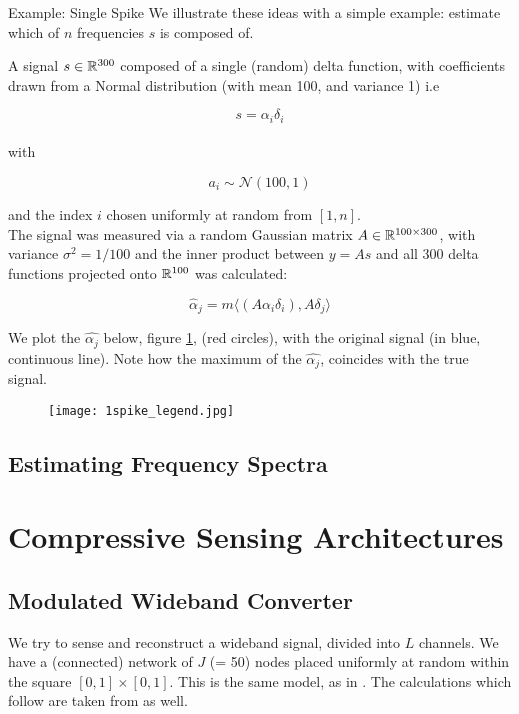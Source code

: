 \begin{example}{Example: Single Spike}
We illustrate these ideas with a simple example: estimate which of \(n\) frequencies \(s\) is composed of.

A signal \(s \in {\mathbb{R}}^{300}\) composed of a single (random) delta function, with coefficients drawn from a Normal distribution (with mean 100, and variance 1) i.e 

\begin{equation}
s = \alpha_i \delta_i
\end{equation}
\\
with 

\begin{equation}
a_i \sim \mathcal{N}\left(100, 1\right)
\end{equation}

and the index \(i\) chosen uniformly at random from \([1, n]\).
\\
The signal was measured via a random Gaussian matrix \(A \in {\mathbb{R}}^{100 \times 300}\), with variance \(\sigma^2 = 1/
100 \) and the inner product between \(y = As\) and all 300 delta functions projected onto \({\mathbb{R}}^{100}\) was calculated:

\begin{equation}
\hat{\alpha}_j = m\langle (A\alpha_i\delta_i), A\delta_j \rangle
\end{equation} 

We plot the \(\hat{\alpha_j}\) below, figure \ref{fig:new_basis_25}, (red circles), with the original signal (in blue, continuous line). Note how the maximum of the \(\hat{\alpha_j}\), coincides with the true signal.

\begin{figure}[h]
\centering
\texttt{[image: 1spike\_legend.jpg]}
\caption{}
\label{fig:new_basis_25}
\end{figure}
\end{example}
\subsection{Estimating Frequency Spectra}\label{sec:freq-model}


\section{Compressive Sensing Architectures}\label{sec:sensingmodel}

\subsection{Modulated Wideband Converter}\label{sec:MWC}
We try to sense and reconstruct a wideband signal, divided into \(L\) channels. We have a (connected) network of \(J\) (= 50) nodes placed uniformly at random within the square \(  \left[0,1\right]\times \left[0,1\right] \). This is the same model, as in \cite{Zhang2011b}. The calculations which follow are taken from \cite{Zhang2011b} as well.

